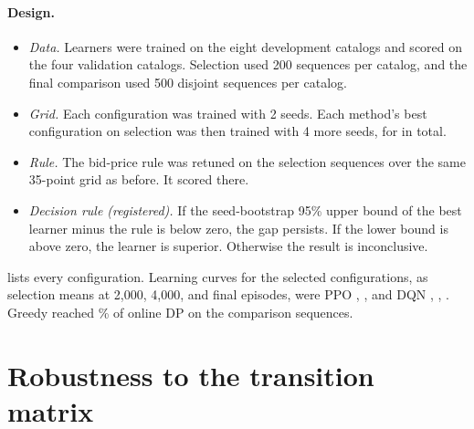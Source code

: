 \documentclass[10pt]{article}
\begin{document}
\paragraph{Design.}
\begin{itemize}[leftmargin=*]
  \item \emph{Data.} Learners were trained on the eight development catalogs and scored on the four validation catalogs. Selection used 200 sequences per catalog, and the final comparison used 500 disjoint sequences per catalog.
  \item \emph{Grid.} Each configuration was trained with 2 seeds. Each method's best configuration on selection was then trained with 4 more seeds, for \lsSeeds{} in total.
  \item \emph{Rule.} The bid-price rule was retuned on the selection sequences over the same 35-point grid as before. It scored \lsRuleSel{} there.
  \item \emph{Decision rule (registered).} If the seed-bootstrap 95\% upper bound of the best learner minus the rule is below zero, the gap persists. If the lower bound is above zero, the learner is superior. Otherwise the result is inconclusive.
\end{itemize}
 lists every configuration. Learning curves for the selected configurations, as selection means at 2{,}000, 4{,}000, and final episodes, were PPO \lsPPOCurveA, \lsPPOCurveB, \lsPPOCurveC{} and DQN \lsDQNCurveA, \lsDQNCurveB, \lsDQNCurveC. Greedy reached \lsGreedyFrac\% of online DP on the comparison sequences.

\begin{table}[H]
\centering\small
\caption{Learner-strength check on validation catalogs. Both columns average all seeds of a configuration (2 per configuration, 6 for the selected one); configurations were selected on the 2 grid seeds only. The comparison column uses fresh sequences and gives the percentage of online-DP surplus (\lsOnlineMean) with the mean surplus in parentheses. Source: \texttt{figure\_data/tmlr\_learner\_strength.csv}.}
\label{tab:strength}

\end{table}

\section{Robustness to the transition matrix}\label{app:transitions}
\end{document}
